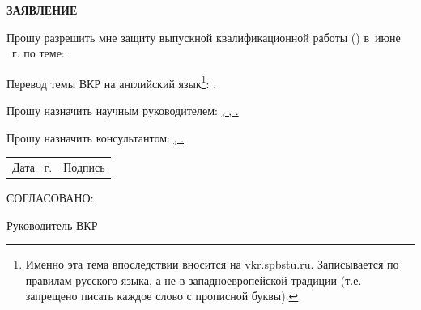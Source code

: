 \vspace{0pt plus1fill} %


{\centering%
	
	\MakeUppercase{\bfseries{}Заявление} \\ 

	
	
}\par%

\intervalS%

	Прошу разрешить мне защиту выпускной квалификационной работы (\thesisDegree) в~июне \thesisYear~г. по теме: {\expandafter \ulined \thesisTitle.}
	
\intervalS%
	
	Перевод темы ВКР на английский язык\footnote{Именно эта тема впоследствии вносится на vkr.spbstu.ru.
		Записывается по правилам русского языка, а не в западноевропейской традиции (т.е. запрещено писать каждое слово с прописной буквы).}:
	{\expandafter \ulined \thesisTitleEn.}
	
	
	

	
\intervalS%

Прошу назначить научным руководителем: \uline{\SupervisorJobVin, \SupervisorDegree, \SupervisorVin.}

\intervalS%

Прошу назначить консультантом: \uline{\ConsultantExtraDegreeVin{}, \ConsultantExtraVin.}

\intervalS%


\noindent
\begin{minipage}{\linewidth}
	\vspace{\mfloatsep} %
	\begin{tabularx}{\linewidth}{Xl}

		\hspace*{-0.7em} Дата \uline{\thesisStartDate}~г. &Подпись \underline{\hspace*{0.1\textheight}} \\
		\end{tabularx}
	\vspace{\mfloatsep} %
\end{minipage}

\intervalS%

\noindent\MakeUppercase{Согласовано:}

\intervalS%

\noindent Руководитель ВКР \uline{\hspace*{0.1\textheight} \Supervisor}


